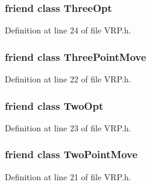 \hypertarget{class_v_r_p_af723275dce636f74121f91687deedc70}{
\subsubsection[{ThreeOpt}]{\setlength{\rightskip}{0pt plus 5cm}friend class {\bf ThreeOpt}}}
\label{class_v_r_p_af723275dce636f74121f91687deedc70}


Definition at line 24 of file VRP.h.

\hypertarget{class_v_r_p_af9c805ac13341028e10098c88c60b2ba}{
\subsubsection[{ThreePointMove}]{\setlength{\rightskip}{0pt plus 5cm}friend class {\bf ThreePointMove}}}
\label{class_v_r_p_af9c805ac13341028e10098c88c60b2ba}


Definition at line 22 of file VRP.h.

\hypertarget{class_v_r_p_a0c92c8936f6281af1fd5ed7eac0ebf7a}{
\subsubsection[{TwoOpt}]{\setlength{\rightskip}{0pt plus 5cm}friend class {\bf TwoOpt}}}
\label{class_v_r_p_a0c92c8936f6281af1fd5ed7eac0ebf7a}


Definition at line 23 of file VRP.h.

\hypertarget{class_v_r_p_a39ceb628e29d77c67f2f02033a2947fd}{
\subsubsection[{TwoPointMove}]{\setlength{\rightskip}{0pt plus 5cm}friend class {\bf TwoPointMove}}}
\label{class_v_r_p_a39ceb628e29d77c67f2f02033a2947fd}


Definition at line 21 of file VRP.h.



